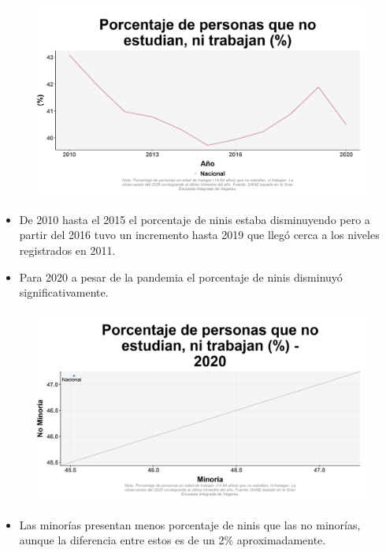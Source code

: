     \begin{figure}[H]
        \caption[Personas que no estudian ni trabajan a nivel nacional ]{\label{nini_nal_trend} }
        \begin{center}
        \includegraphics[width=\textwidth,keepaspectratio]{img/var_36_trend.png}
        \end{center}
    \end{figure}
            \begin{itemize}
                \item De 2010 hasta el 2015 el porcentaje de ninis estaba disminuyendo pero a partir del 2016 tuvo un incremento hasta 2019 que llegó cerca a los niveles registrados en 2011.
                \item Para 2020 a pesar de la pandemia el porcentaje de ninis disminuyó significativamente.
                \end{itemize}

    \begin{figure}[H]
        \caption[Personas que no estudian ni trabajan por minorías y no minorías para 2020 ]{\label{nini_minoria_scatter} }
        \begin{center}
        \includegraphics[width=\textwidth,keepaspectratio]{img/var_34_scatter.png}
        \end{center}
    \end{figure}
            \begin{itemize}
                \item Las minorías presentan menos porcentaje de ninis que las no minorías, aunque la diferencia entre estos es de un 2\% aproximadamente.
                \end{itemize}

